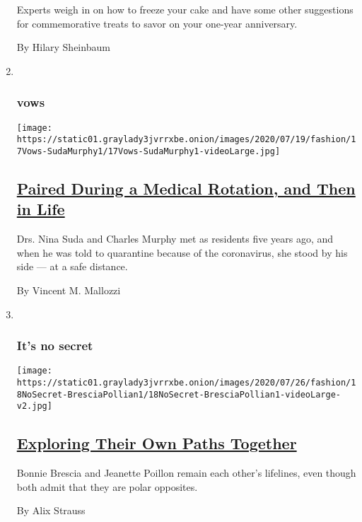 \begin{enumerate}
  Experts weigh in on how to freeze your cake and have some other
  suggestions for commemorative treats to savor on your one-year
  anniversary.

  By Hilary Sheinbaum
\item ~
  \hypertarget{vows-2}{%
  \subsubsection{vows}\label{vows-2}}

  \texttt{[image: https://static01.graylady3jvrrxbe.onion/images/2020/07/19/fashion/17Vows-SudaMurphy1/17Vows-SudaMurphy1-videoLarge.jpg]}

  \hypertarget{paired-during-a-medical-rotation-and-then-in-life}{%
  \subsection{\texorpdfstring{\href{/2020/07/17/fashion/weddings/paired-during-a-medical-rotation-and-then-in-life.html}{Paired
  During a Medical Rotation, and Then in
  Life}}{Paired During a Medical Rotation, and Then in Life}}\label{paired-during-a-medical-rotation-and-then-in-life}}

  Drs. Nina Suda and Charles Murphy met as residents five years ago, and
  when he was told to quarantine because of the coronavirus, she stood
  by his side --- at a safe distance.

  By Vincent M. Mallozzi
\item ~
  \hypertarget{its-no-secret}{%
  \subsubsection{It's no secret}\label{its-no-secret}}

  \texttt{[image: https://static01.graylady3jvrrxbe.onion/images/2020/07/26/fashion/18NoSecret-BresciaPollian1/18NoSecret-BresciaPollian1-videoLarge-v2.jpg]}

  \hypertarget{exploring-their-own-paths-together}{%
  \subsection{\texorpdfstring{\href{/2020/07/18/fashion/weddings/exploring-their-own-paths-together.html}{Exploring
  Their Own Paths
  Together}}{Exploring Their Own Paths Together}}\label{exploring-their-own-paths-together}}

  Bonnie Brescia and Jeanette Poillon remain each other's lifelines,
  even though both admit that they are polar opposites.

  By Alix Strauss
\end{enumerate}

